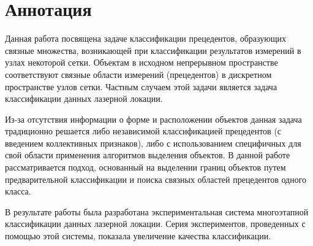 \newpage
\section*{Аннотация}


Данная работа посвящена задаче классификации прецедентов, образующих связные множества, возникающей при классификации результатов измерений в узлах некоторой сетки. Объектам в исходном непрерывном пространстве соответствуют связные области измерений (прецедентов) в дискретном пространстве узлов сетки. Частным случаем этой задачи является задача классификации данных лазерной локации.

Из-за отсутствия информации о форме и расположении объектов данная задача традиционно решается либо независимой классификацией прецедентов (с введением коллективных признаков), либо с использованием специфичных для свой области применения алгоритмов выделения объектов. В данной работе рассматривается подход, основанный на выделении границ объектов путем предварительной классификации и поиска связных областей прецедентов одного класса.

В результате работы была разработана экспериментальная система многоэтапной классификации данных лазерной локации. Серия экспериментов, проведенных с помощью этой системы, показала увеличение качества классификации.


